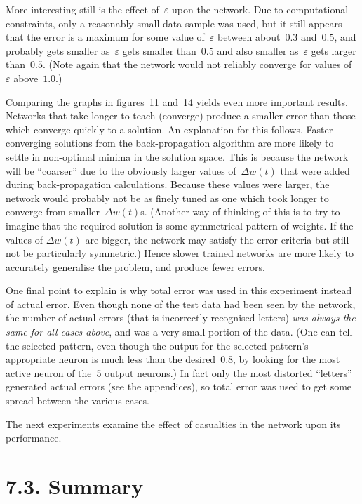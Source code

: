 \documentclass[12pt]{report}
\begin{document}
More interesting still is the effect of~$\varepsilon$ upon the
network.
Due to computational constraints, only a reasonably small data
sample was used, but it still appears that the error is a maximum
for some value of~$\varepsilon$ between about~$0.3$ and~$0.5$, and probably
gets smaller as~$\varepsilon$ gets smaller than~$0.5$ and also
smaller as~$\varepsilon$ gets larger than~$0.5$. 
(Note again that the
network would not reliably converge for values of~$\varepsilon$
above~$1.0$.)

Comparing the graphs in figures~11 and~14 yields even more important
results.
Networks that take longer to teach (converge) produce a smaller
error than those which converge quickly to a solution.
An explanation for this follows.
Faster converging solutions from the back-propagation algorithm are
more likely to settle in non-optimal minima in the solution space.
This is because the network will be ``coarser'' due to the obviously
larger values of~$\Delta w(t)$ that were added during
back-propagation calculations.
Because these values were larger, the network would probably not be
as finely tuned as one which took longer to converge from
smaller~$\Delta w(t)$s.
(Another way of thinking of this is to try to imagine that the
required solution is some symmetrical pattern of weights.
If the values of $\Delta w(t)$ are bigger, the network may satisfy
the error criteria but still not be particularly symmetric.)
Hence slower trained networks are more likely to accurately
generalise the problem, and produce fewer errors.

One final point to explain is why total error was used in this
experiment instead of actual error.
Even though none of the test data had been seen by the network, the
number of actual errors (that is incorrectly recognised letters)
{\sl was always the same for all cases above\/}, and was a very
small portion of the data.
(One can tell the selected pattern, even though the output for the
selected pattern's appropriate neuron is much less than the
desired~$0.8$, by looking for the most active neuron of the~5 output
neurons.)
In fact only the most distorted ``letters'' generated actual errors
(see the appendices), so total error was used to get some spread
between the various cases.

The next experiments examine the effect of casualties in the network
upon its performance.

\section{7.3. Summary}
\end{document}
